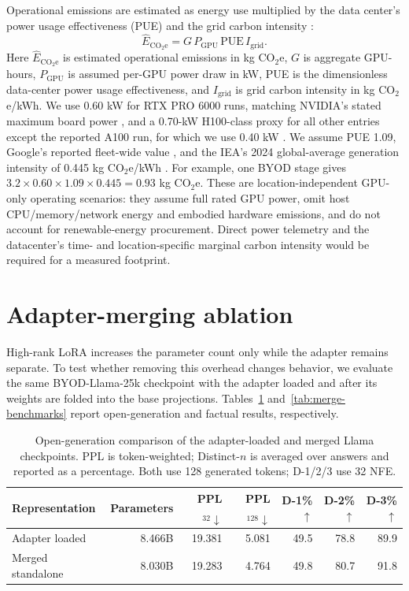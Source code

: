 \documentclass{article}
\begin{document}
Operational emissions are estimated as energy use multiplied by the data center's power usage effectiveness (PUE) and the grid carbon intensity \citep{lannelongue2021green,patterson2021carbon}:
\begin{equation}
\widehat{E}_{\mathrm{CO_2e}}=G\,P_{\mathrm{GPU}}\,\mathrm{PUE}\,I_{\mathrm{grid}}.
\end{equation}
Here $\widehat{E}_{\mathrm{CO_2e}}$ is estimated operational emissions in kg CO$_2$e, $G$ is aggregate GPU-hours, $P_{\mathrm{GPU}}$ is assumed per-GPU power draw in kW, PUE is the dimensionless data-center power usage effectiveness, and $I_{\mathrm{grid}}$ is grid carbon intensity in kg CO$_2$e/kWh. We use 0.60 kW for RTX PRO 6000 runs, matching NVIDIA's stated maximum board power \citep{nvidiaRTXPro6000}, and a 0.70-kW H100-class proxy for all other entries except the reported A100 run, for which we use 0.40 kW \citep{nvidiaH100,nvidiaA100}. We assume PUE 1.09, Google's reported fleet-wide value \citep{googlePUE2025}, and the IEA's 2024 global-average generation intensity of 0.445 kg CO$_2$e/kWh \citep{ieaElectricity2025}. For example, one BYOD stage gives $3.2\times0.60\times1.09\times0.445=0.93$ kg CO$_2$e. These are location-independent GPU-only operating scenarios: they assume full rated GPU power, omit host CPU/memory/network energy and embodied hardware emissions, and do not account for renewable-energy procurement. Direct power telemetry and the datacenter's time- and location-specific marginal carbon intensity would be required for a measured footprint.

\section{Adapter-merging ablation}
\label{app:merge}

High-rank LoRA increases the parameter count only while the adapter remains separate. To test whether removing this overhead changes behavior, we evaluate the same BYOD-Llama-25k checkpoint with the adapter loaded and after its weights are folded into the base projections. Tables~\ref{tab:merge-open-generation} and~\ref{tab:merge-benchmarks} report open-generation and factual results, respectively.

\begin{table}[!htbp]
\caption{Open-generation comparison of the adapter-loaded and merged Llama checkpoints. PPL is token-weighted; Distinct-$n$ is averaged over answers and reported as a percentage. Both use 128 generated tokens; D-1/2/3 use 32 NFE.}
\label{tab:merge-open-generation}
\centering
\scriptsize
\begin{tabular}{lrrrrrr}
\toprule
Representation & Parameters & PPL$_{32}\downarrow$ & PPL$_{128}\downarrow$ & D-1\%$\uparrow$ & D-2\%$\uparrow$ & D-3\%$\uparrow$ \\
\midrule
Adapter loaded & 8.466B & 19.381 & 5.081 & 49.5 & 78.8 & 89.9 \\
Merged standalone & 8.030B & 19.283 & 4.764 & 49.8 & 80.7 & 91.8 \\
\bottomrule
\end{tabular}
\end{table}
\end{document}
